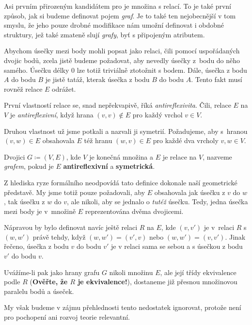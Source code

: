 Asi prvním přirozeným kandidátem pro  je množina s relací. To je
také první způsob, jak si budeme definovat pojem \emph{graf}. Je to také ten
nejobecnější v tom smyslu, že jeho pouze drobné modifikace nám umožní definovat
i obdobné struktury, jež také zmateně slují \emph{grafy}, byť s připojeným
atributem.

Abychom úsečky mezi body mohli popsat jako relaci, čili pomocí uspořádaných
dvojic bodů, zcela jistě budeme požadovat, aby nevedly úsečky z~bodu do něho
samého. Úsečku délky $0$ lze totiž triviálně ztotožnit s bodem. Dále, úsečka z
bodu $A$ do bodu $B$ je jistě tatáž, kterak úsečka z bodu $B$ do bodu $A$. Tento
fakt musí rovněž relace $E$ odrážet.

První vlastností relace se, snad nepřekvapivě, říká \emph{antireflexivita}.
Čili, relace $E$ na $V$ je \emph{antireflexivní}, když hrana $(v,v) \notin E$
pro každý vrchol $v \in V$.

Druhou vlastnost už jsme potkali a nazvali ji symetrií. Požadujeme, aby s~hranou
$(v,w) \in E$ obsahovala $E$ též hranu $(w,v) \in E$ pro každé dva vrcholy $v,w
\in V$.

\begin{definition}
\label{def:graf-poprve}
 Dvojici $G \coloneqq (V,E)$, kde $V$ je konečná množina a $E$ je relace na $V$,
 nazveme \emph{grafem}, pokud je $E$ \textbf{antireflexivní} a
 \textbf{symetrická}.
\end{definition}

\begin{remark}
 Z hlediska ryze formálního neodpovídá tato definice dokonale naší geometrické
 představě. My jsme totiž pouze požadovali, aby $E$ obsahovala jak úsečku z $v$ 
 do $w$, tak úsečku z $w$ do $v$, ale nikoli, aby se jednalo o \emph{tutéž}
 úsečku. Tedy, jedna úsečka mezi body je v~množině $E$ reprezentována dvěma
 dvojicemi.

 Nápravou by bylo definovat navíc ještě relaci $R$ na $E$, kde $(v,v')$ je
 v~relaci $R$ s $(w,w')$ právě tehdy, když $(w,w') = (v',v)$ nebo $(w,w') =
 (v,v')$. Jinak řečeno, úsečka z bodu $v$ do bodu $v'$ je v relaci sama se sebou
 a s úsečkou z bodu $v'$ do bodu $v$.

 Uvážíme-li pak jako hrany grafu $G$ nikoli množinu $E$, ale její třídy
 ekvivalence podle $R$ (\textbf{Ověřte, že $R$ je ekvivalence!}), dostaneme již
 přesnou množinovou paralelu bodů a úseček.

 My však budeme v zájmu přehlednosti tento nedostatek ignorovat, protože není
 pro pochopení ani rozvoj teorie relevantní.
\end{remark}

